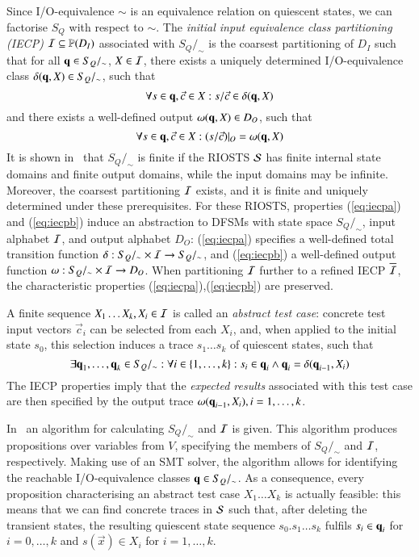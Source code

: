 Since I/O-equivalence  $\sim$ is an equivalence relation on quiescent states, 
we can factorise $S_Q$ with respect to  $\sim$.
The \emph{initial input equivalence class partitioning (IECP)} ${\cal I}\subseteq\mathbb{P}(D_I)$ 
associated with $S_Q/_\sim$ is 
the coarsest partitioning of $D_I$ such that for all $\textbf{q}\in S_Q/_\sim$, $X\in {\cal I}$,
there exists a uniquely determined I/O-equivalence class $ \delta(\textbf{q},X)\in S_Q/_\sim$, 
such that
\begin{equation}\label{eq:iecpa}
 \forall s\in \textbf{q}, \vec c\in X: s/\vec c \in \delta(\textbf{q},X)
\end{equation}
and there exists a well-defined output $\omega(\textbf{q},X)\in D_O$, such that
\begin{equation}\label{eq:iecpb}
\forall s\in \textbf{q}, \vec c\in X: (s/\vec c)|_O =  \omega(\textbf{q},X)
\end{equation}
It is shown in~\cite{peleska_sttt_2014} that $S_Q/_\sim$ is finite
 if the RIOSTS ${\cal S}$
has finite internal state domains and finite output domains, while the input domains may be infinite.
Moreover,   the coarsest partitioning ${\cal I}$  exists, and it is finite and uniquely determined under these prerequisites.
For these RIOSTS, 
properties (\ref{eq:iecpa}) and (\ref{eq:iecpb}) induce an abstraction    
  to DFSMs   
with state space $S_Q/_\sim$, input alphabet ${\cal I}$, and output alphabet
$D_O$:  (\ref{eq:iecpa})
specifies a well-defined total transition function $\delta : S_Q/_\sim\times {\cal I} \rightarrow S_Q/_\sim$, and (\ref{eq:iecpb}) a well-defined
output function $\omega : S_Q/_\sim\times {\cal I} \rightarrow D_O$.
When partitioning ${\cal I}$ further to a refined IECP $\overline{\cal I}$,
the characteristic properties (\ref{eq:iecpa}),(\ref{eq:iecpb}) are preserved.  

A finite sequence $X_1\dots X_k, X_i\in{\cal I}$   is called an \emph{abstract test case}:
concrete test input vectors $\vec c_i$  can be selected from each $X_i$, and, when applied
to the initial state $s_0$, this selection induces a trace $s_1\dots s_k$ of 
quiescent states, such that
$$
\exists \textbf{q}_1,\dots,\textbf{q}_k\in  S_Q/_\sim:\forall i \in \{ 1,\dots,k \}: 
s_i\in \textbf{q}_i\wedge \textbf{q}_i = \delta(\textbf{q}_{i-1},X_i)
$$
The IECP properties imply that the
\emph{expected results} associated with this test case are then specified by the
output trace $\omega(\textbf{q}_{i-1},X_i), i=1,\dots,k$.


 

In~\cite{peleska_sttt_2014} an algorithm for calculating  $S_Q/_\sim$ and ${\cal I}$ is given.
This algorithm produces propositions over variables from $V$, 
specifying the members of $S_Q/_\sim$ and ${\cal I}$, respectively. Making use of an SMT solver, the algorithm allows for identifying the  reachable I/O-equivalence classes
 $\textbf{q} \in S_Q/_\sim$. As a consequence, every proposition characterising an abstract test
 case $X_1\dots X_k$  is actually feasible: this means that we can find concrete
traces in ${\cal S}$ such that, after deleting the transient states, the resulting
quiescent state sequence $s_0.s_1\dots s_k$ fulfils $s_i\in\textbf{q}_i$ for $i = 0,\dots,k$ 
and $s(\vec x)\in X_i$ for $i = 1,\dots,k$.

